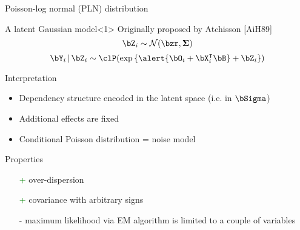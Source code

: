 \begin{frame}{{P}oisson-log normal (PLN) distribution}

  \begin{block}{A latent Gaussian model}<1>
  Originally proposed by Atchisson [AiH89]
  \[
    \bZ_i \sim \mathcal{N}(\bzr, \boldsymbol\Sigma)
  \]
  \[
    \bY_i \,|\, \bZ_i \sim \clP(\exp{\{\alert{\bO_i + \bX_i^\intercal \bB} + \bZ_i\}})
  \]
  \end{block}

  \vfill

  \begin{block}{Interpretation}
    \vspace{-.25cm}
  \begin{itemize}
   \item Dependency structure encoded in the latent space (i.e. in $\bSigma$)
   \item Additional effects are fixed
   \item Conditional Poisson distribution = noise model
  \end{itemize}
  \end{block}

  \begin{block}{Properties}
    \vspace{-.25cm}
      \begin{itemize}
        \item[\textcolor{green}{+}] over-dispersion
        \item[\textcolor{green}{+}] covariance with arbitrary signs
        \item[\textcolor{mred}{-}] maximum likelihood via EM algorithm is limited to a couple of variables
      \end{itemize}
  \end{block}

\end{frame}

